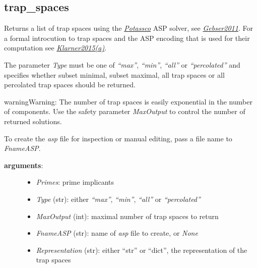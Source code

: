 \documentclass[letterpaper,10pt,english]{sphinxmanual}
\begin{document}
\subsection{trap\_spaces}
\label{TrapSpaces:id2}\label{TrapSpaces:trap-spaces}

\begin{fulllineitems}
\label{TrapSpaces:PyBoolNet.TrapSpaces.trap_spaces}
Returns a list of trap spaces using the {\hyperref[Installation:installation-potassco]{\emph{Potassco}}} ASP solver, see {\hyperref[Bibliography:gebser2011]{\emph{Gebser2011}}}.
For a formal introcution to trap spaces and the ASP encoding that is used for their computation see {\hyperref[Bibliography:klarner2015trap]{\emph{Klarner2015(a)}}}.

The parameter \emph{Type} must be one of \emph{``max''}, \emph{``min''}, \emph{``all''} or \emph{``percolated''} and
specifies whether subset minimal, subset maximal, all trap spaces or all percolated trap spaces should be returned.

\begin{notice}{warning}{Warning:}
The number of trap spaces is easily exponential in the number of components.
Use the safety parameter \emph{MaxOutput} to control the number of returned solutions.
\end{notice}

To create the \emph{asp} file for inspection or manual editing, pass a file name to \emph{FnameASP}.
\begin{description}
\item[{\textbf{arguments}:}] \leavevmode\begin{itemize}
\item {} 
\emph{Primes}: prime implicants

\item {} 
\emph{Type} (str): either \emph{``max''}, \emph{``min''}, \emph{``all''} or \emph{``percolated''}

\item {} 
\emph{MaxOutput} (int): maximal number of trap spaces to return

\item {} 
\emph{FnameASP} (str): name of \emph{asp} file to create, or \emph{None}

\item {} 
\emph{Representation} (str): either ``str'' or ``dict'', the representation of the trap spaces


\end{itemize}
\end{description}
\end{fulllineitems}
\end{document}
